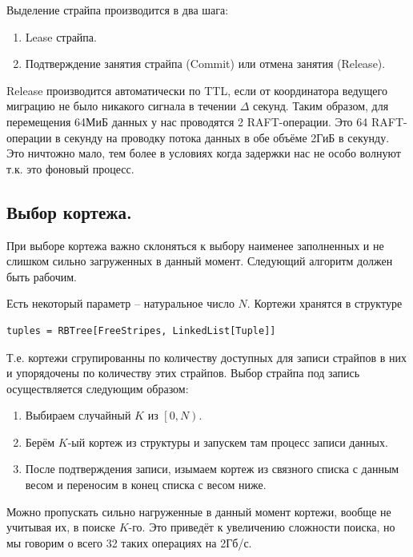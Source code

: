 \documentclass[a4paper,12pt]{article}
\begin{document}
\begin{center}
    \end{center}
    Выделение страйпа производится в два шага:

    \begin{enumerate}
        \item Lease страйпа.
        \item Подтверждение занятия страйпа (Commit) или отмена занятия (Release).
    \end{enumerate}

    Release производится автоматически по TTL, если от координатора ведущего миграцию не было никакого сигнала в течении $\Delta$ секунд. Таким образом, для перемещения 64МиБ данных у нас
    проводятся 2 RAFT-операции. Это 64 RAFT-операции в секунду на проводку потока данных в обе объёме 2ГиБ в секунду. Это ничтожно мало, тем более в условиях когда задержки нас не особо
    волнуют т.к. это фоновый процесс.

    \subsection{Выбор кортежа.}

    При выборе кортежа важно склоняться к выбору наименее заполненных и не слишком сильно загруженных в данный момент. Следующий алгоритм должен
    быть рабочим.

    Есть некоторый параметр – натуральное число $N$. Кортежи хранятся в структуре
    \begin{lstlisting}
tuples = RBTree[FreeStripes, LinkedList[Tuple]]
    \end{lstlisting}
    Т.е. кортежи сгрупированны по количеству доступных для записи страйпов в них и упорядочены по количеству этих страйпов. Выбор страйпа под
    запись осуществляется следующим образом:
    \begin{enumerate}
        \item Выбираем случайный $K$ из $\left[ 0, N \right)$.
        \item Берём $K$-ый кортеж из структуры и запускем там процесс записи данных.
        \item После подтверждения записи, изымаем кортеж из связного списка с данным весом и переносим в конец списка с весом ниже.
    \end{enumerate}
    Можно пропускать сильно нагруженные в данный момент кортежи, вообще не учитывая их, в поиске $K$-го. Это приведёт
    к увеличению сложности поиска, но мы говорим о всего 32 таких операциях на 2Гб/с.
\end{document}
